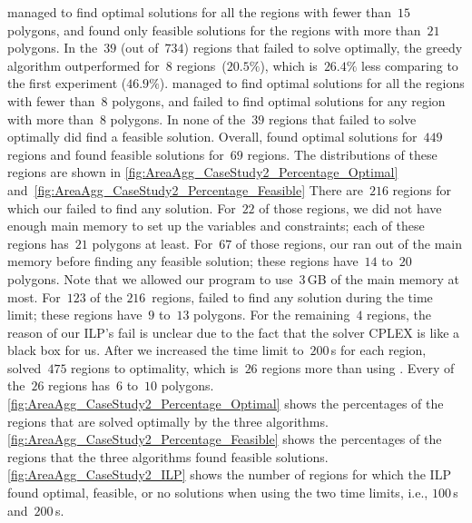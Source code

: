\Astar managed to find optimal solutions 
for all the regions with fewer than~$15$ polygons, and 
found only feasible solutions for the regions 
with more than~$21$ polygons.
%
In the~$39$ (out of~$734$) regions 
that \Astar failed to solve optimally,
the greedy algorithm outperformed \Astar 
for~$8$ regions~($20.5\%$), 
which is~$26.4\%$ less comparing to the first experiment ($46.9\%$).
%
\ILPOne managed to find optimal solutions 
for all the regions with fewer than~$8$ polygons,
and failed to find optimal solutions
for any region with more than~$8$ polygons.
In none of the~$39$ regions 
that \Astar failed to solve optimally
did \ILPOne find a feasible solution.
Overall, \ILPOne 
found optimal solutions for~$449$ regions
and found feasible solutions for~$69$ regions.
The distributions of these regions are shown in
\figs\ref{fig:AreaAgg_CaseStudy2_Percentage_Optimal}
and~\fig\ref{fig:AreaAgg_CaseStudy2_Percentage_Feasible}
There are~$216$ regions for which 
our \ILPOne failed to find any solution.
For~$22$ of those regions, 
we did not have enough main memory 
to set up the variables and constraints;
each of these regions has~$21$ polygons at least.
For~$67$ of those regions, 
our \ILPOne ran out of the main memory 
before finding any feasible solution;
these regions have~$14$ to~$20$ polygons.
Note that we allowed our program to use~$3\,$GB 
of the main memory at most.
For~$123$ of the $216$~regions, 
\ILPOne failed to find any solution
during the time limit;
these regions have~$9$ to~$13$ polygons.
For the remaining~$4$ regions, 
the reason of our ILP's fail is unclear 
due to the fact that 
the solver CPLEX is like a black box for us.
After we increased the time limit to~$200\,$s for each region, 
\ILPTwo solved~$475$ regions to optimality, which 
is~$26$ regions more than using \ILPOne.
Every of the~$26$ regions has~$6$ to~$10$ polygons.
\fig\ref{fig:AreaAgg_CaseStudy2_Percentage_Optimal}
shows the percentages of the regions 
that are solved optimally by the three algorithms.
\fig\ref{fig:AreaAgg_CaseStudy2_Percentage_Feasible} 
shows the percentages of the regions 
that the three algorithms found feasible solutions.
\fig\ref{fig:AreaAgg_CaseStudy2_ILP} shows 
the number of regions for which 
the ILP found optimal, feasible, or no solutions 
when using the two time limits, i.e., $100\,$s and~$200\,$s.


